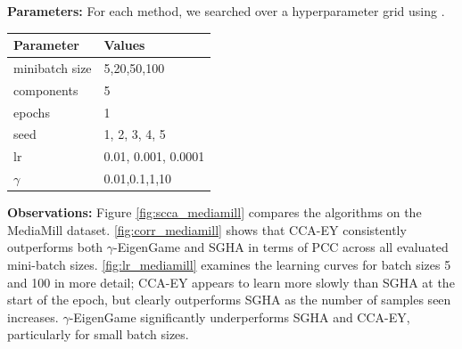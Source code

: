 \textbf{Parameters:} For each method, we searched over a hyperparameter grid using \citet{wandb}.

\begin{table}[h!]
    \centering
    \begin{tabular}{|l|l|}
        \hline Parameter             & Values              \\
        \hline minibatch size        & 5,20,50,100         \\
        \hline components            & 5                   \\
        \hline epochs                & 1                   \\
        \hline seed                  & 1, 2, 3, 4, 5       \\
        \hline lr                    & 0.01, 0.001, 0.0001 \\
        \hline $\gamma$\footnotemark & 0.01,0.1,1,10       \\
        \hline
    \end{tabular}
\end{table}

\textbf{Observations:}
Figure \ref{fig:scca_mediamill} compares the algorithms on the MediaMill dataset. \cref{fig:corr_mediamill} shows that CCA-EY consistently outperforms both $\gamma$-EigenGame and SGHA in terms of PCC across all evaluated mini-batch sizes.
\cref{fig:lr_mediamill} examines the learning curves for batch sizes 5 and 100 in more detail; CCA-EY appears to learn more slowly than SGHA at the start of the epoch, but clearly outperforms SGHA as the number of samples seen increases. $\gamma$-EigenGame significantly underperforms SGHA and CCA-EY, particularly for small batch sizes.

